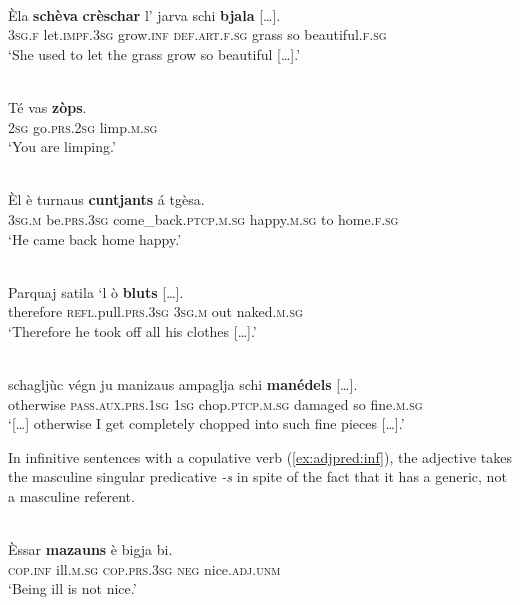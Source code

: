\ea
\label{schèwithagr}
\\
\gll    Èla \textbf{schèva} \textbf{crèschar} l’ jarva schi \textbf{bjala} […].\\
    \textsc{3sg.f} let.\textsc{impf.3sg} grow.\textsc{inf} \textsc{def.art.f.sg} grass so beautiful.\textsc{f.sg} \\
\glt `She used to let the grass grow so beautiful […].'
\z
 
 \ea\label{Ex:adj.agr3}
 \\
 \gll  Té vas \textbf{zòps}.\\
 \textsc{2sg} go.\textsc{prs.2sg} limp.\textsc{m.sg} \textsc{} \textsc{} \textsc{} \textsc{} \textsc{} \\
 \glt `You are limping.'
 \z
 
 \ea
 \label{ex:adj.agr4}
 \\
 \gll Èl è turnaus \textbf{cuntjants} á tgèsa.\\
 \textsc{3sg.m} be.\textsc{prs.3sg} come\_back.\textsc{ptcp.m.sg} happy.\textsc{m.sg} to home.\textsc{f.sg} \\
 \glt `He came back home happy.'
 \z
 
 \ea\label{ex:adj.agr5}
 \\
 \gll    Parquaj satila ‘l ò \textbf{bluts} […].\\
 therefore \textsc{refl}.pull.\textsc{prs.3sg} \textsc{3sg.m} out naked.\textsc{m.sg}\\
 \glt `Therefore he took off all his clothes […].'
 \z
 
 \ea\label{ex:adj.agr6}
 \\
 \gll    […] schagljùc végn ju manizaus ampaglja schi \textbf{manédels} […].\\
 {} otherwise \textsc{pass.aux.prs.1sg} \textsc{1sg} chop.\textsc{ptcp.m.sg} damaged so fine.\textsc{m.sg}\\
 \glt `[…] otherwise I get completely chopped into such fine pieces […].'
 \z
 
 In infinitive sentences with a copulative verb (\ref{ex:adjpred:inf}), the adjective takes the masculine singular predicative \textit{-s} in spite of the fact that it has a generic, not a masculine referent.
 
 \ea
 \label{ex:adjpred:inf}
 \\
 \gll Èssar \textbf{mazauns} è bigja bi.\\
 \textsc{cop.inf} ill.\textsc{m.sg} \textsc{cop.prs.3sg} \textsc{neg} nice.\textsc{adj.unm}\\
 \glt `Being ill is not nice.'
 \z
 
